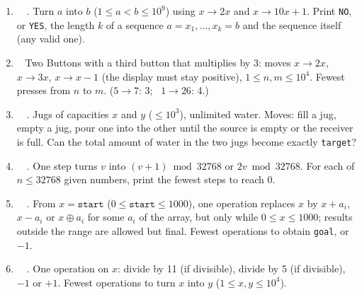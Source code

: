 \exlegend
\begin{enumerate}[leftmargin=*, label=\textbf{E4.\arabic*}, itemsep=6pt]
    \setlength{\emergencystretch}{2em}
    \item \exeasy\ \pconcept {}\ . Turn $a$ into $b$ ($1 \le a < b \le 10^9$) using $x \to 2x$ and $x \to 10x + 1$. Print \texttt{NO}, or \texttt{YES}, the length $k$ of a sequence $a = x_1, \dots, x_k = b$ and the sequence itself (any valid one).
    \item \exmedium\ \ptricky {} Two Buttons with a third button that multiplies by 3: moves $x \to 2x$, $x \to 3x$, $x \to x-1$ (the display must stay positive), $1 \le n, m \le 10^4$. Fewest presses from $n$ to $m$. ($5 \to 7$: 3; \ $1 \to 26$: 4.)
    \item \exmedium\ \pclassic {}\ . Jugs of capacities $x$ and $y$ ($\le 10^3$), unlimited water. Moves: fill a jug, empty a jug, pour one into the other until the source is empty or the receiver is full. Can the total amount of water in the two jugs become exactly \texttt{target}?
    \item \exmedium\ \pconcept {}\ . One step turns $v$ into $(v+1) \bmod 32768$ or $2v \bmod 32768$. For each of $n \le 32768$ given numbers, print the fewest steps to reach 0.
    \item \exmedium\ \ptricky {}\ . From $x = \texttt{start}$ ($0 \le \texttt{start} \le 1000$), one operation replaces $x$ by $x + a_i$, $x - a_i$ or $x \oplus a_i$ for some $a_i$ of the array, but only while $0 \le x \le 1000$; results outside the range are allowed but final. Fewest operations to obtain \texttt{goal}, or $-1$.
    \item \exmedium\ \precent {}\ . One operation on $x$: divide by 11 (if divisible), divide by 5 (if divisible), $-1$ or $+1$. Fewest operations to turn $x$ into $y$ ($1 \le x, y \le 10^4$).
\end{enumerate}

